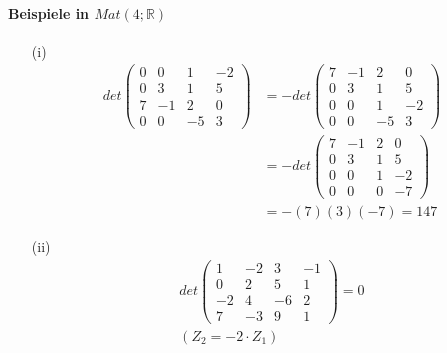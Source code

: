 \documentclass[11pt]{report}
\newcommand*\Zb[1] {\mathbb{#1}}
\begin{document}
\paragraph{Beispiele in $Mat(4; \Zb{R})$}
\begin{itemize}
\item[(i)]
\begin{align}
det
\begin{pmatrix} 
0 & 0 & 1 & -2 \\
0 & 3 & 1 & 5 \\
7 & -1 & 2 & 0 \\
0 & 0 & -5 & 3
\end{pmatrix}
&= - det
\begin{pmatrix} 
7 & -1 & 2 & 0 \\
0 & 3 & 1 & 5 \\
0 & 0 & 1 & -2 \\
0 & 0 & -5 & 3
\end{pmatrix} \\
&= -det 
\begin{pmatrix} 
7 & -1 & 2 & 0 \\
0 & 3 & 1 & 5 \\
0 & 0 & 1 & -2 \\
0 & 0 & 0 & -7
\end{pmatrix} \\
&= -(7)(3)(-7) = 147
\end{align}

\item[(ii)]
\begin{align}
det 
\begin{pmatrix} 
1 & -2 & 3 & -1 \\
0 & 2 & 5 & 1 \\
-2 & 4 & -6 & 2 \\
7 & -3 & 9 & 1
\end{pmatrix} = 0 \\
(Z_2 = -2\cdot Z_1)
\end{align}


\end{itemize}
\end{document}
